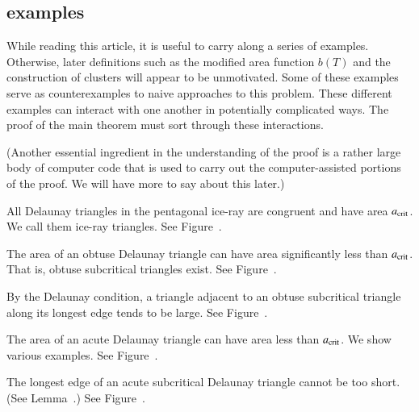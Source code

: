 \subsection{examples}

While reading this article, it is useful to carry along a series of examples.
Otherwise, later definitions such as the modified area function $b(T)$
and the construction of clusters will appear to be unmotivated.  Some
of these examples serve as counterexamples to naive approaches to this
problem.  These different examples can interact with one another in
potentially complicated ways.  The proof of the main theorem must sort
through these interactions.

(Another essential ingredient in the understanding of the proof is a
rather large body of computer code that is used to carry out the
computer-assisted portions of the proof.  We will have more to say
about this later.)

\begin{example} 
  All Delaunay triangles in the pentagonal ice-ray are congruent and
  have area $a_\text{crit}$.  We call them ice-ray triangles. See
  Figure~.
\end{example}


\begin{example}  
  The area of an obtuse Delaunay triangle can have area significantly
  less than $a_\text{crit}$.  That is, obtuse subcritical triangles exist.
  See Figure~.
\end{example}


\begin{example} 
  By the Delaunay condition, a triangle adjacent to an obtuse
  subcritical triangle along its longest edge tends to be large. See
  Figure~.
\end{example}


\begin{example} 
  The area of an acute Delaunay triangle can have area less than
  $a_\text{crit}$.  We show various examples.  See
  Figure~.
\end{example}


\begin{example} 
  The longest edge of an acute subcritical Delaunay triangle cannot be
  too short.  (See Lemma~.) See
  Figure~.
\end{example}

